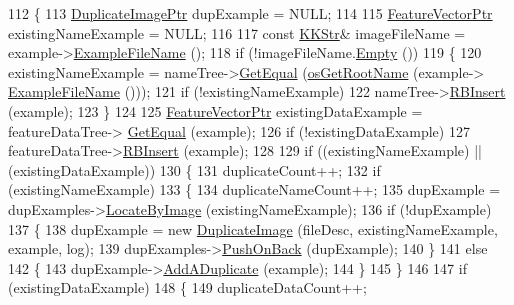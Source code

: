 \begin{DoxyCode}
112 \{
113   \hyperlink{class_k_k_m_l_l_1_1_duplicate_image}{DuplicateImagePtr} dupExample = NULL;
114 
115   \hyperlink{class_k_k_m_l_l_1_1_feature_vector}{FeatureVectorPtr}    existingNameExample = NULL;
116 
117   \textcolor{keyword}{const} \hyperlink{class_k_k_b_1_1_k_k_str}{KKStr}&  imageFileName = example->\hyperlink{class_k_k_m_l_l_1_1_feature_vector_ab47c89ab1e9396664fdc0dc34b6e1ab5}{ExampleFileName} ();
118   \textcolor{keywordflow}{if}  (!imageFileName.\hyperlink{class_k_k_b_1_1_k_k_str_ac69942f73fffd672ec2a6e1c410afdb6}{Empty} ())
119   \{
120     existingNameExample = nameTree->\hyperlink{class_k_k_b_1_1_r_b_tree_a9f157c30cce4885b8abac7f4981321e9}{GetEqual} (\hyperlink{namespace_k_k_b_af5b668ed9902d7f93b62529664a739f0}{osGetRootName} (example->
      \hyperlink{class_k_k_m_l_l_1_1_feature_vector_ab47c89ab1e9396664fdc0dc34b6e1ab5}{ExampleFileName} ()));
121     \textcolor{keywordflow}{if}  (!existingNameExample)
122       nameTree->\hyperlink{class_k_k_b_1_1_r_b_tree_a210190ae61de6e1a7b15b39673e6a47d}{RBInsert} (example);
123   \}
124 
125   \hyperlink{class_k_k_m_l_l_1_1_feature_vector}{FeatureVectorPtr}  existingDataExample = featureDataTree->
      \hyperlink{class_k_k_m_l_l_1_1_image_features_data_indexed_ac1d88a8fca173b68de713c5131f16436}{GetEqual} (example);
126   \textcolor{keywordflow}{if}  (!existingDataExample)
127     featureDataTree->\hyperlink{class_k_k_m_l_l_1_1_image_features_data_indexed_a74efce26e6c36ca48036f4bee1e3743f}{RBInsert} (example);
128   
129   \textcolor{keywordflow}{if}  ((existingNameExample)  ||  (existingDataExample))
130   \{
131     duplicateCount++;
132     \textcolor{keywordflow}{if}  (existingNameExample)
133     \{
134       duplicateNameCount++;
135       dupExample = dupExamples->\hyperlink{class_k_k_m_l_l_1_1_duplicate_image_list_a2cb6d2138592775258d3878ea0927c39}{LocateByImage} (existingNameExample);
136       \textcolor{keywordflow}{if}  (!dupExample)
137       \{
138         dupExample = \textcolor{keyword}{new} \hyperlink{class_k_k_m_l_l_1_1_duplicate_image}{DuplicateImage} (fileDesc, existingNameExample, example, log);
139         dupExamples->\hyperlink{class_k_k_b_1_1_k_k_queue_aa9fba4632b54268bf71ecb42dee0b575}{PushOnBack} (dupExample);
140       \}
141       \textcolor{keywordflow}{else}
142       \{
143         dupExample->\hyperlink{class_k_k_m_l_l_1_1_duplicate_image_ae4f0ded72efe70cb97baf74e2f0f154b}{AddADuplicate} (example);
144       \}
145     \}
146     
147     \textcolor{keywordflow}{if}  (existingDataExample) 
148     \{
149       duplicateDataCount++;

\end{DoxyCode}
